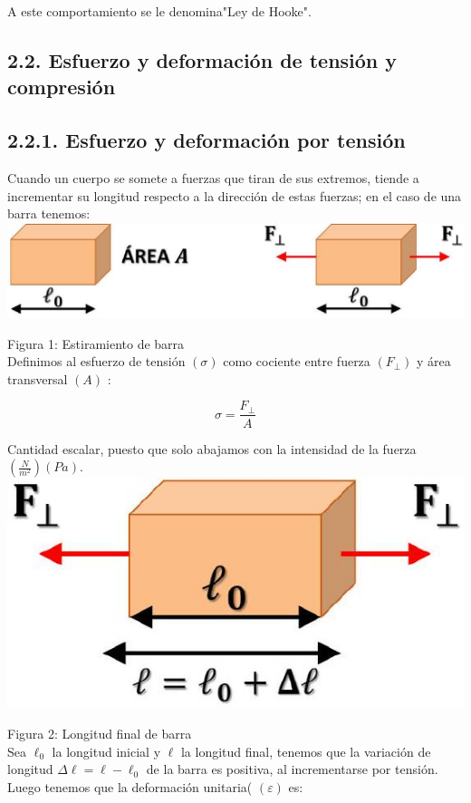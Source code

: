 \documentclass[10pt]{article}
\begin{document}
A este comportamiento se le denomina"Ley de Hooke".

\subsection*{2.2. Esfuerzo y deformación de tensión y compresión}
\subsection*{2.2.1. Esfuerzo y deformación por tensión}
Cuando un cuerpo se somete a fuerzas que tiran de sus extremos, tiende a incrementar su longitud respecto a la dirección de estas fuerzas; en el caso de una barra tenemos:\\
\includegraphics[max width=\textwidth, center]{2025_04_28_a9941da8947ada55c6c9g-03(1)}

Figura 1: Estiramiento de barra\\
Definimos al esfuerzo de tensión $(\sigma)$ como cociente entre fuerza $\left(F_{\perp}\right)$ y área transversal $(A)$ :


\begin{equation*}
\sigma=\frac{F_{\perp}}{A} \tag{2}
\end{equation*}


Cantidad escalar, puesto que solo abajamos con la intensidad de la fuerza $\left(\frac{N}{m^{2}}\right)(P a)$.\\
\includegraphics[max width=\textwidth, center]{2025_04_28_a9941da8947ada55c6c9g-03}

Figura 2: Longitud final de barra\\
Sea $\ell_{0}$ la longitud inicial y $\ell$ la longitud final, tenemos que la variación de longitud $\Delta \ell=\ell-\ell_{0}$ de la barra es positiva, al incrementarse por tensión. Luego tenemos que la deformación unitaria( $(\varepsilon)$ es:
\end{document}
